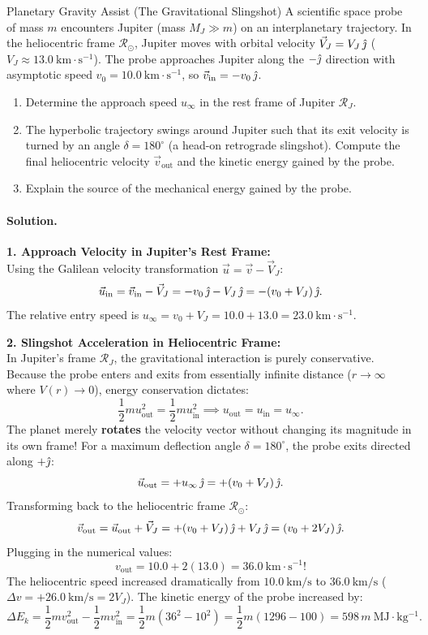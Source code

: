 \begin{workedexample}{Planetary Gravity Assist (The Gravitational Slingshot)}
A scientific space probe of mass $m$ encounters Jupiter (mass $M_J \gg m$) on an interplanetary trajectory. In the heliocentric frame $\mathcal{R}_{\odot}$, Jupiter moves with orbital velocity $\vec{V}_J = V_J\,\hat{\jmath}$ ($V_J \approx 13.0\ \mathrm{km\cdot s^{-1}}$). The probe approaches Jupiter along the $-\hat{\jmath}$ direction with asymptotic speed $v_0 = 10.0\ \mathrm{km\cdot s^{-1}}$, so $\vec{v}_{\text{in}} = -v_0\,\hat{\jmath}$.
\begin{enumerate}[leftmargin=1.4em,itemsep=3pt]
  \item Determine the approach speed $u_\infty$ in the rest frame of Jupiter $\mathcal{R}_J$.
  \item The hyperbolic trajectory swings around Jupiter such that its exit velocity is turned by an angle $\delta = 180^\circ$ (a head-on retrograde slingshot). Compute the final heliocentric velocity $\vec{v}_{\text{out}}$ and the kinetic energy gained by the probe.
  \item Explain the source of the mechanical energy gained by the probe.
\end{enumerate}

\paragraph{Solution.}
\textbf{1. Approach Velocity in Jupiter's Rest Frame:}\\
Using the Galilean velocity transformation $\vec{u} = \vec{v} - \vec{V}_J$:
\[
\vec{u}_{\text{in}} = \vec{v}_{\text{in}} - \vec{V}_J = -v_0\,\hat{\jmath} - V_J\,\hat{\jmath} = -(v_0 + V_J)\,\hat{\jmath}.
\]
The relative entry speed is $u_\infty = v_0 + V_J = 10.0 + 13.0 = 23.0\ \mathrm{km\cdot s^{-1}}$.

\textbf{2. Slingshot Acceleration in Heliocentric Frame:}\\
In Jupiter's frame $\mathcal{R}_J$, the gravitational interaction is purely conservative. Because the probe enters and exits from essentially infinite distance ($r \to \infty$ where $V(r) \to 0$), energy conservation dictates:
\[
\frac{1}{2}m u_{\text{out}}^2 = \frac{1}{2}m u_{\text{in}}^2 \implies u_{\text{out}} = u_{\text{in}} = u_\infty.
\]
The planet merely \textbf{rotates} the velocity vector without changing its magnitude in its own frame!
For a maximum deflection angle $\delta = 180^\circ$, the probe exits directed along $+\hat{\jmath}$:
\[
\vec{u}_{\text{out}} = +u_\infty\,\hat{\jmath} = +(v_0 + V_J)\,\hat{\jmath}.
\]
Transforming back to the heliocentric frame $\mathcal{R}_\odot$:
\[
\vec{v}_{\text{out}} = \vec{u}_{\text{out}} + \vec{V}_J = +(v_0 + V_J)\,\hat{\jmath} + V_J\,\hat{\jmath} = (v_0 + 2V_J)\,\hat{\jmath}.
\]
Plugging in the numerical values:
\[
v_{\text{out}} = 10.0 + 2(13.0) = 36.0\ \mathrm{km\cdot s^{-1}}!
\]
The heliocentric speed increased dramatically from $10.0\ \mathrm{km/s}$ to $36.0\ \mathrm{km/s}$ ($\Delta v = +26.0\ \mathrm{km/s} = 2V_J$).
The kinetic energy of the probe increased by:
\[
\Delta E_k = \frac{1}{2}m v_{\text{out}}^2 - \frac{1}{2}m v_{\text{in}}^2 = \frac{1}{2}m \left( 36^2 - 10^2 \right) = \frac{1}{2}m(1296 - 100) = 598\,m\ \mathrm{MJ\cdot kg^{-1}}.
\]


\end{workedexample}
